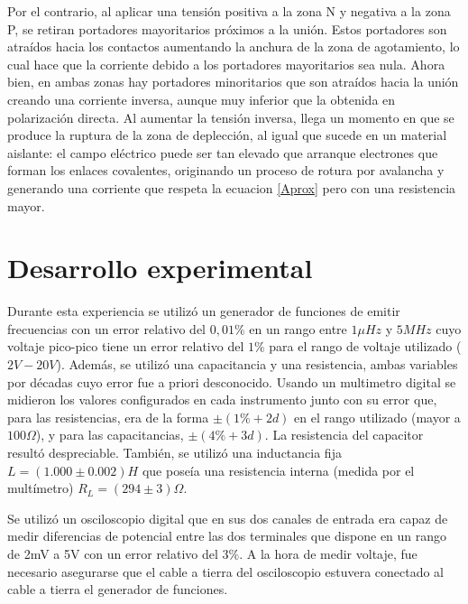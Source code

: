 \documentclass[11pt,a4paper]{article}
\begin{document}
 Por el contrario, al aplicar una tensión positiva a la zona N y negativa a la zona P, se retiran portadores mayoritarios próximos a la unión. Estos portadores son atraídos hacia los contactos aumentando la anchura de la zona de agotamiento, lo cual hace que la corriente debido a los portadores mayoritarios sea nula. Ahora bien, en ambas zonas hay portadores minoritarios que son atraídos hacia la unión creando una corriente inversa, aunque muy inferior que la obtenida en polarización directa. Al aumentar la tensión inversa, llega un momento en que se produce la ruptura de la zona de deplección, al igual que sucede en un material aislante: el campo eléctrico puede ser tan elevado que arranque electrones que forman los enlaces covalentes, originando un proceso de rotura por avalancha y generando una corriente que respeta la ecuacion \eqref{Aprox} pero con una resistencia mayor.


\section{Desarrollo experimental}

Durante esta experiencia se utilizó un generador de funciones de emitir frecuencias con un error relativo del $0,01\%$ en un rango entre $1\mu Hz$ y $5MHz$ cuyo voltaje pico-pico tiene un error relativo del $1\%$ para el rango de voltaje utilizado ($2V-20V$). Además, se utilizó una capacitancia y una resistencia, ambas variables por décadas cuyo error fue a priori desconocido. Usando un multimetro digital se midieron los valores configurados en cada instrumento junto con su error que, para las resistencias, era de la forma $\pm(1\%+2d)$ en el rango utilizado (mayor a $100\Omega$), y para las  capacitancias, $\pm(4\%+3d)$. La resistencia del capacitor resultó despreciable. También, se utilizó una inductancia fija $L = (1.000 \pm 0.002) H$ que poseía una resistencia interna (medida por el multímetro) $R_L = (294 \pm 3) \Omega$.

Se utilizó un osciloscopio digital que en sus dos canales de entrada era capaz de medir diferencias de potencial entre las dos terminales que dispone en un rango de 2mV a 5V con un error relativo del $3\%$. A la hora de medir voltaje, fue necesario asegurarse que el cable a tierra del osciloscopio estuvera conectado al cable a tierra el generador de funciones. 
\end{document}
